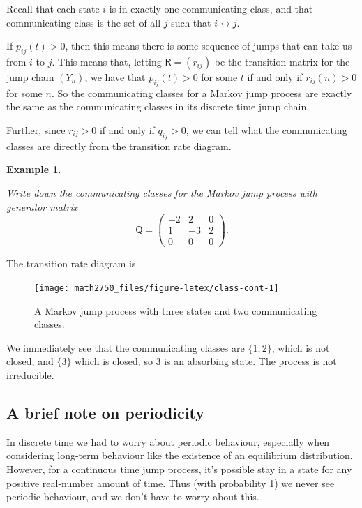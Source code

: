 \documentclass[
  a4paper,
]{article}
\theoremstyle{definition}
\theoremstyle{definition}
\newtheorem{example}{Example}[section]
\theoremstyle{definition}
\theoremstyle{remark}
\begin{document}
Recall that each state \(i\) is in exactly one communicating class, and that communicating class is the set of all \(j\) such that \(i \leftrightarrow j\).

If \(p_{ij}(t) > 0\), then this means there is some sequence of jumps that can take us from \(i\) to \(j\). This means that, letting \(\mathsf R = (r_{ij})\) be the transition matrix for the jump chain \((Y_n)\), we have that \(p_{ij}(t) > 0\) for some \(t\) if and only if \(r_{ij}(n) > 0\) for some \(n\). So the communicating classes for a Markov jump process are exactly the same as the communicating classes in its discrete time jump chain.

Further, since \(r_{ij} > 0\) if and only if \(q_{ij} > 0\), we can tell what the communicating classes are directly from the transition rate diagram.

\begin{example}
\protect\hypertarget{exm:jump-classes}{}\label{exm:jump-classes}

\emph{Write down the communicating classes for the Markov jump process with generator matrix}
\[ \mathsf Q = \begin{pmatrix} -2 & 2 & 0 \\ 1 & -3 & 2 \\ 0 & 0 & 0 \end{pmatrix}. \]

The transition rate diagram is

\begin{figure}

{\centering \texttt{[image: math2750\_files/figure-latex/class-cont-1]} 

}

\caption{A Markov jump process with three states and two communicating classes.}\label{fig:class-cont}
\end{figure}

We immediately see that the communicating classes are \(\{1,2\}\), which is not closed, and \(\{3\}\) which is closed, so 3 is an absorbing state. The process is not irreducible.

\end{example}

\hypertarget{periods2}{%
\subsection{A brief note on periodicity}\label{periods2}}

In discrete time we had to worry about periodic behaviour, especially when considering long-term behaviour like the existence of an equilibrium distribution. However, for a continuous time jump process, it's possible stay in a state for any positive real-number amount of time. Thus (with probability 1) we never see periodic behaviour, and we don't have to worry about this.
\end{document}
